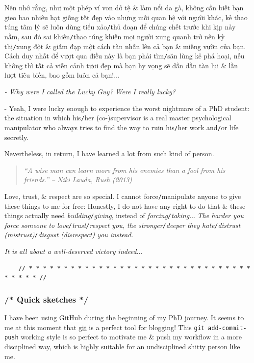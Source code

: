 \documentclass[12pt]{article}
\begin{document}
Nên nhớ rằng, như một phép ví von dở tệ \& làm nổi da gà, không cần biết bạn gieo bao nhiêu hạt giống tốt đẹp vào những mối quan hệ với người khác, kẻ thao túng tâm lý sẽ luôn dùng tiểu xảo{\tt/}thủ đoạn để chúng chết trước khi kịp nảy nầm, sau đó sai khiến{\tt/}thao túng khiến mọi người xung quanh trở nên kỳ thị{\tt/}xung đột \& giẫm đạp một cách tàn nhẫn lên cả bạn \& miếng vườn của bạn. Cách duy nhất để vượt qua điều này là bạn phải tìm{\tt/}săn lùng kẻ phá hoại, nếu không thì tất cả viễn cảnh tươi đẹp mà bạn hy vọng sẽ dần dần tàn lụi \& lần lượt tiêu biến, bao gồm luôn cả bạn!$\ldots$

{\it - Why were I called the Lucky Guy? Were I really lucky?}

- Yeah, I were lucky enough to experience the worst nightmare of a PhD student: the situation in which his{\tt/}her (co-)supervisor is a real master psychological manipulator who always tries to find the way to ruin his{\tt/}her work and{\tt/}or life secretly.

Nevertheless, in return, I have learned a lot from such kind of person.

\begin{quotation}\it
	``A wise man can learn more from his enemies than a fool from his friends.'' -- {\sc Niki Lauda}, Rush (2013)
\end{quotation}
Love, trust, \& respect are so special. I cannot force{\tt/}manipulate anyone to give these things to me for free: Honestly, I do not have any right to do that \& these things actually need {\it building{\tt/}giving}, instead of {\it forcing{\tt/}taking}$\ldots$ {\it The harder you force someone to love{\tt/}trust{\tt/}respect you, the stronger{\tt/}deeper they hate{\tt/}distrust (mistrust){\tt/}disgust (disrespect) you instead.}

{\it It is all about a well-deserved victory indeed}$\ldots$

\begin{verbatim}
	// * * * * * * * * * * * * * * * * * * * * * * * * * * * * * * * * * * * * * //
\end{verbatim}

\subsubsection{{\color{gray}/* Quick sketches */}}
 I have been using \href{https://github.com}{GitHub} during the beginning of my PhD journey. It seems to me at this moment that \href{https://git-scm.com/}{git} is a perfect tool for blogging! This {\tt git add-commit-push} working style is so perfect to motivate me \& push my workflow in a more disciplined way, which is highly suitable for an undisciplined shitty person like me.
\end{document}
